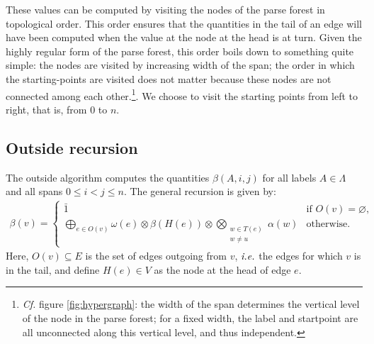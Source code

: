     These values can be computed by visiting the nodes of the parse forest in topological order. This order ensures that the quantities in the tail of an edge will have been computed when the value at the node at the head is at turn. Given the highly regular form of the parse forest, this order boils down to something quite simple: the nodes are visited by increasing width of the span; the order in which the starting-points are visited does not matter because these nodes are not connected among each other.\footnote{\textit{Cf.} figure \ref{fig:hypergraph}: the width of the span determines the vertical level of the node in the parse forest; for a fixed width, the label and startpoint are all unconnected along this vertical level, and thus independent.}. We choose to visit the starting points from left to right, that is, from 0 to $n$.

  \subsection{Outside recursion}
    The outside algorithm computes the quantities $\beta(A,i,j)$ for all labels $A \in \Lambda$ and all spans $0 \leq i < j \leq n$. The general recursion is given by:
    \begin{align*}
      \beta(v) =
        \begin{cases}
          \bar{1}  & \mbox{if } O(v) = \varnothing, \\
          \displaystyle\bigoplus_{e \in O(v)} \omega(e) \otimes \beta(H(e)) \otimes \displaystyle\bigotimes_{ \substack{ w \in T(e) \\ w \neq u } } \alpha(w)  & \mbox{otherwise.}
        \end{cases}
    \end{align*}
    Here, $O(v) \subseteq E$ is the set of edges outgoing from $v$, $\emph{i.e.}$ the edges for which $v$ is in the tail, and define $H(e) \in V$ as the node at the head of edge $e$.

